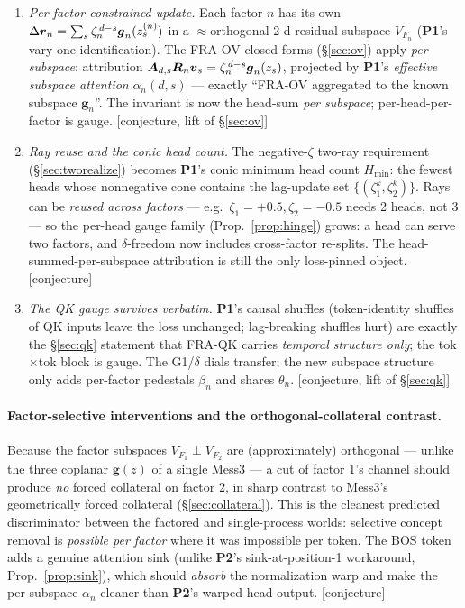 \documentclass{article}
\newcommand{\gb}{\boldsymbol{g}}
\newcommand{\bped}{\beta}
\newcommand{\htag}[1]{{\normalfont\sffamily\footnotesize[#1]}}
\newcommand{\Pone}{\textbf{P1}}
\newcommand{\Ptwo}{\textbf{P2}}
\begin{document}
\begin{enumerate}
\item \emph{Per-factor constrained update.} Each factor $n$ has its own
$\Delta\rb_n=\sum_s\zeta_n^{\,d-s}\gb_n(z_s^{(n)})$ in a ${\approx}$orthogonal 2-d
residual subspace $V_{F_n}$ (\Pone's vary-one identification). The FRA-OV closed forms
(\S\ref{sec:ov}) apply \emph{per subspace}: attribution
$\Ab_{d,s}\Rb_n\vb_s=\zeta_n^{\,d-s}\gb_n(z_s)$, projected by \Pone's \emph{effective
subspace attention} $\alpha_n(d,s)$ --- exactly ``FRA-OV aggregated to the known
subspace $\gb_n$''. The invariant is now the head-sum \emph{per subspace};
per-head-per-factor is gauge. \htag{conjecture, lift of \S\ref{sec:ov}}
\item \emph{Ray reuse and the conic head count.} The negative-$\zeta$ two-ray
requirement (\S\ref{sec:tworealize}) becomes \Pone's conic minimum head count
$H_{\min}$: the fewest heads whose nonnegative cone contains the lag-update set
$\{(\zeta_1^k,\zeta_2^k)\}$. Rays can be \emph{reused across factors} --- e.g.\
$\zeta_1=+0.5,\zeta_2=-0.5$ needs 2 heads, not 3 --- so the per-head gauge family
(Prop.~\ref{prop:hinge}) grows: a head can serve two factors, and $\delta$-freedom now
includes cross-factor re-splits. The head-summed-per-subspace attribution is still the
only loss-pinned object. \htag{conjecture}
\item \emph{The QK gauge survives verbatim.} \Pone's causal shuffles (token-identity
shuffles of QK inputs leave the loss unchanged; lag-breaking shuffles hurt) are exactly
the \S\ref{sec:qk} statement that FRA-QK carries \emph{temporal structure only}; the
tok$\times$tok block is gauge. The G1/$\delta$ dials transfer; the new subspace
structure only adds per-factor pedestals $\bped_n$ and shares $\theta_n$.
\htag{conjecture, lift of \S\ref{sec:qk}}
\end{enumerate}

\paragraph{Factor-selective interventions and the orthogonal-collateral contrast.}
Because the factor subspaces $V_{F_1}\perp V_{F_2}$ are (approximately) orthogonal ---
unlike the three coplanar $\gb(z)$ of a single Mess3 --- a cut of factor 1's channel
should produce \emph{no} forced collateral on factor 2, in sharp contrast to Mess3's
geometrically forced collateral (\S\ref{sec:collateral}). This is the cleanest
predicted discriminator between the factored and single-process worlds: selective
concept removal is \emph{possible per factor} where it was impossible per token.
The BOS token adds a genuine attention sink (unlike \Ptwo's sink-at-position-1
workaround, Prop.~\ref{prop:sink}), which should \emph{absorb} the normalization warp
and make the per-subspace $\alpha_n$ cleaner than \Ptwo's warped head output.
\htag{conjecture}
\end{document}
